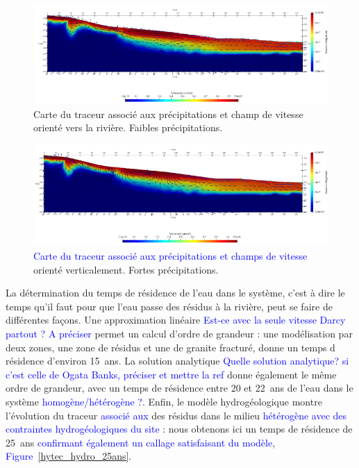 \documentclass{article}
\newcommand{\blue}[1]{\textcolor{blue}{#1}} %
\begin{document}
\begin{figure}[H]
    \centering
    \includegraphics[width=0.9\linewidth]{III_B_3_6.png}
    
    \caption{Carte du traceur associé aux précipitations et champ de vitesse orienté vers la rivière. Faibles précipitations.}
    \label{fig:v_précipitations_ribiere_1}
\end{figure}

\begin{figure}[H]
    \centering
    \includegraphics[width=0.9\linewidth]{III_B_3_7.png}
    
    \caption{\blue{Carte du traceur associé aux précipitations et champs de vitesse }orienté verticalement. Fortes précipitations.}
    \label{fig:v_précipitations_ribiere_2}
\end{figure}

La détermination du temps de résidence de l'eau dans le système, c'est à dire le temps qu'il faut pour que l'eau passe des résidus à la rivière, peut se faire de différentes façons. Une approximation linéaire \blue{Est-ce avec la seule vitesse Darcy partout ? A préciser } permet un calcul d’ordre de grandeur : une modélisation par deux zones, une zone de résidus et une de granite fracturé, donne un temps d résidence d’environ 15~ans. La solution analytique \blue{Quelle solution analytique? si c'est celle de Ogata Banks, préciser et mettre la ref} donne également le même ordre de grandeur, avec un temps de résidence entre 20 et 22~ans de l'eau dans le système \blue{homogène/hétérogène ?}. Enfin, le modèle hydrogéologique montre l’évolution du traceur \blue{associé aux} des résidus dans le milieu \blue{hétérogène avec des contraintes hydrogéologiques du site} : nous obtenons ici un temps de résidence de 25~ans \blue{confirmant également un callage satisfaisant du modèle}, \blue{Figure~\ref{hytec_hydro_25ans}}.
\end{document}
